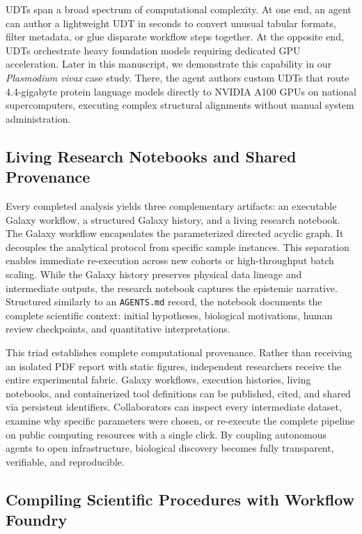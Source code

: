 \documentclass[11pt,letterpaper]{article}
\begin{document}
UDTs span a broad spectrum of computational complexity. At one end, an agent can author a lightweight UDT in seconds to convert unusual tabular formats, filter metadata, or glue disparate workflow steps together. At the opposite end, UDTs orchestrate heavy foundation models requiring dedicated GPU acceleration. Later in this manuscript, we demonstrate this capability in our \textit{Plasmodium vivax} case study. There, the agent authors custom UDTs that route 4.4-gigabyte protein language models directly to NVIDIA A100 GPUs on national supercomputers, executing complex structural alignments without manual system administration.

\subsection{Living Research Notebooks and Shared Provenance}

Every completed analysis yields three complementary artifacts: an executable Galaxy workflow, a structured Galaxy history, and a living research notebook. The Galaxy workflow encapsulates the parameterized directed acyclic graph. It decouples the analytical protocol from specific sample instances. This separation enables immediate re-execution across new cohorts or high-throughput batch scaling. While the Galaxy history preserves physical data lineage and intermediate outputs, the research notebook captures the epistemic narrative. Structured similarly to an \texttt{AGENTS.md} record, the notebook documents the complete scientific context: initial hypotheses, biological motivations, human review checkpoints, and quantitative interpretations.

This triad establishes complete computational provenance. Rather than receiving an isolated PDF report with static figures, independent researchers receive the entire experimental fabric. Galaxy workflows, execution histories, living notebooks, and containerized tool definitions can be published, cited, and shared via persistent identifiers. Collaborators can inspect every intermediate dataset, examine why specific parameters were chosen, or re-execute the complete pipeline on public computing resources with a single click. By coupling autonomous agents to open infrastructure, biological discovery becomes fully transparent, verifiable, and reproducible.

\subsection{Compiling Scientific Procedures with Workflow Foundry}
\end{document}
